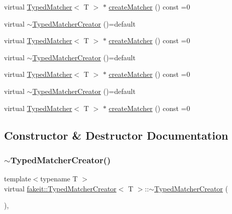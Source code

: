\begin{DoxyCompactItemize}
\item 
virtual \mbox{\hyperlink{structfakeit_1_1TypedMatcher}{Typed\+Matcher}}$<$ T $>$ $\ast$ \mbox{\hyperlink{structfakeit_1_1TypedMatcherCreator_a40646cd11f8acf5c34b971f396891d5c}{create\+Matcher}} () const =0
\item 
virtual \mbox{\hyperlink{structfakeit_1_1TypedMatcherCreator_afe705f26e562bceace38fcf1c5e057d0}{$\sim$\+Typed\+Matcher\+Creator}} ()=default
\item 
virtual \mbox{\hyperlink{structfakeit_1_1TypedMatcher}{Typed\+Matcher}}$<$ T $>$ $\ast$ \mbox{\hyperlink{structfakeit_1_1TypedMatcherCreator_a40646cd11f8acf5c34b971f396891d5c}{create\+Matcher}} () const =0
\item 
virtual \mbox{\hyperlink{structfakeit_1_1TypedMatcherCreator_afe705f26e562bceace38fcf1c5e057d0}{$\sim$\+Typed\+Matcher\+Creator}} ()=default
\item 
virtual \mbox{\hyperlink{structfakeit_1_1TypedMatcher}{Typed\+Matcher}}$<$ T $>$ $\ast$ \mbox{\hyperlink{structfakeit_1_1TypedMatcherCreator_a40646cd11f8acf5c34b971f396891d5c}{create\+Matcher}} () const =0
\item 
virtual \mbox{\hyperlink{structfakeit_1_1TypedMatcherCreator_afe705f26e562bceace38fcf1c5e057d0}{$\sim$\+Typed\+Matcher\+Creator}} ()=default
\item 
virtual \mbox{\hyperlink{structfakeit_1_1TypedMatcher}{Typed\+Matcher}}$<$ T $>$ $\ast$ \mbox{\hyperlink{structfakeit_1_1TypedMatcherCreator_a40646cd11f8acf5c34b971f396891d5c}{create\+Matcher}} () const =0
\end{DoxyCompactItemize}


\subsection{Constructor \& Destructor Documentation}
\mbox{\label{structfakeit_1_1TypedMatcherCreator_afe705f26e562bceace38fcf1c5e057d0}} 
\subsubsection{\texorpdfstring{$\sim$TypedMatcherCreator()}{~TypedMatcherCreator()}\hspace{0.1cm}{\footnotesize\ttfamily [1/9]}}
{\footnotesize\ttfamily template$<$typename T $>$ \\
virtual \mbox{\hyperlink{structfakeit_1_1TypedMatcherCreator}{fakeit\+::\+Typed\+Matcher\+Creator}}$<$ T $>$\+::$\sim$\mbox{\hyperlink{structfakeit_1_1TypedMatcherCreator}{Typed\+Matcher\+Creator}} (\begin{DoxyParamCaption}{ }\end{DoxyParamCaption})\hspace{0.3cm}{\ttfamily [virtual]}, {\ttfamily [default]}}

